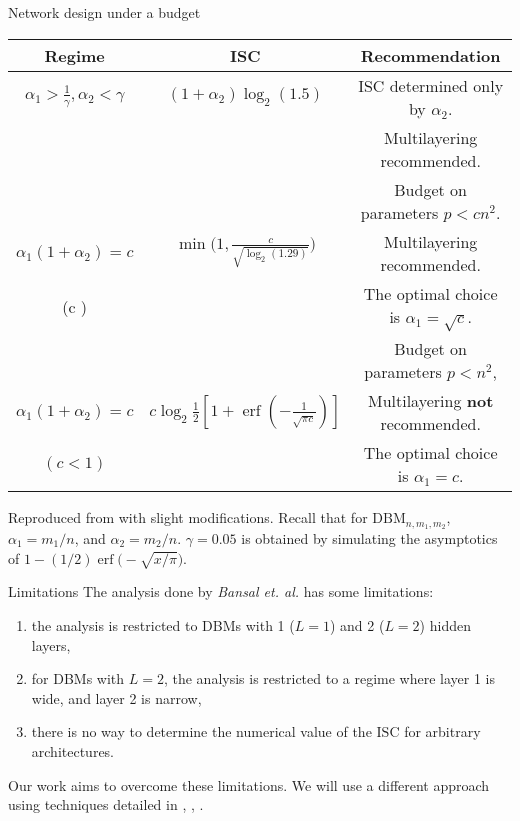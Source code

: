 \documentclass[8pt]{beamer}
\begin{document}
\begin{frame}[label={sec:org2313505}]{Network design under a budget}
\begin{tabular}{|c|c|c|}
\hline
\textbf{Regime} & \textbf{ISC} & \textbf{Recommendation} \\
\hline \hline
\(\alpha_1 > \frac{1}{\gamma}, \alpha_2 < \gamma\) & \((1 + \alpha_2) \log_2(1.5)\) & ISC determined only by \(\alpha_2\). \\
 & & Multilayering recommended. \\
\hline
& & Budget on parameters \(p < cn^2\). \\
\(\alpha_1(1 + \alpha_2) = c\) & \(\min\bigg(1, \frac{c}{\sqrt{\log_2(1.29)}}\bigg)\) & Multilayering recommended. \\
(c \geq 1) & & The optimal choice is \(\alpha_1 = \sqrt{c}\). \\
\hline
& & Budget on parameters \(p < n^2\), \\
\(\alpha_1(1 + \alpha_2) = c\) & \(c \log_2 \frac{1}{2} \left[1 + \operatorname{erf}\left(-\frac{1}{\sqrt{\pi c}}\right)\right]\) & Multilayering \textbf{not} recommended. \\
\((c < 1)\) & & The optimal choice is \(\alpha_1 = c\). \\
\hline
\end{tabular}
\linebreak \linebreak
Reproduced from \cite{bansal2018using} with slight modifications. Recall that for \(\mathrm{DBM}_{n,m_{1}, m_{2}}\), \(\alpha_{1} = m_{1} / n\), and \(\alpha_{2} = m_{2} / n\). \(\gamma = 0.05\) is obtained by simulating the asymptotics of \(1 - (1/2) \operatorname{erf} \big(- \sqrt{x/ \pi} \big)\). 
\end{frame}

\begin{frame}[label={sec:org7702ed6}]{Limitations}
The analysis done by \emph{Bansal et. al.} has some limitations:
\linebreak
\begin{enumerate}
\item the analysis is restricted to DBMs with 1 (\(L = 1\)) and 2 (\(L=2\)) hidden layers,
\linebreak
\item for DBMs with \(L = 2\), the analysis is restricted to a regime where layer 1 is wide, and layer 2 is narrow,
\linebreak
\item there is no way to determine the numerical value of the \(\mathrm{ISC}\) for arbitrary architectures.
\linebreak
\end{enumerate}
Our work aims to overcome these limitations. We will use a different approach using techniques detailed in \cite{singh1995fixed}, \cite{gutfreund1988attractors}, \cite{tanaka1980analytic}.
\end{frame}
\end{document}
